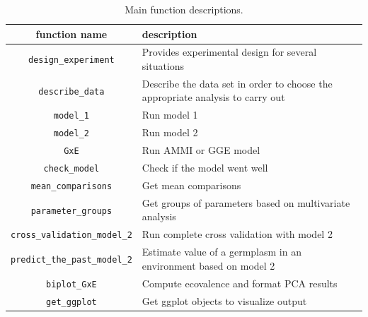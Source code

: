 \documentclass{article}\usepackage[]{graphicx}\usepackage[]{color}
\begin{document}
\begin{table}[H]
\begin{tabular}{cp{}}

\hline
\textbf{function name} & \textbf{description} \\ \hline

\texttt{design\_experiment} & Provides experimental design for several situations \\ \hline

\texttt{describe\_data} & Describe the data set in order to choose the appropriate analysis to carry out \\ \hline

\texttt{model\_1} & Run model 1 \\ \hline

\texttt{model\_2} & Run model 2 \\ \hline

\texttt{GxE} & Run AMMI or GGE model \\ \hline

\texttt{check\_model} &  Check if the model went well \\ \hline

\texttt{mean\_comparisons} &  Get mean comparisons \\ \hline

\texttt{parameter\_groups} & Get groups of parameters based on multivariate analysis \\ \hline

\texttt{cross\_validation\_model\_2} & Run complete cross validation with model 2 \\ \hline

\texttt{predict\_the\_past\_model\_2} & Estimate value of a germplasm in an environment based on model 2 \\ \hline

\texttt{biplot\_GxE} & Compute ecovalence and format PCA results \\ \hline

\texttt{get\_ggplot} & Get ggplot objects to visualize output \\ \hline

\end{tabular}
\caption{Main function descriptions.}
\label{function_descriptions_workflow}
\end{table}
\end{document}
